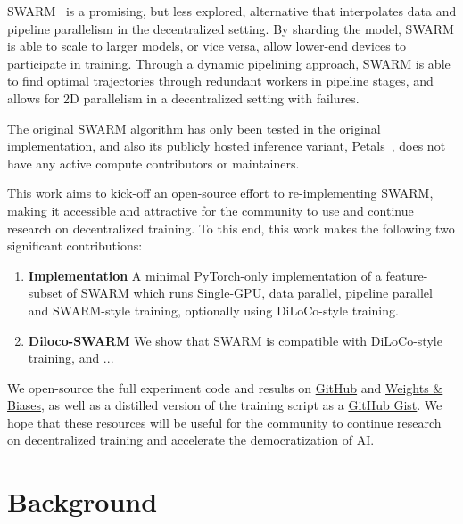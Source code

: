 \documentclass{article}
\begin{document}
SWARM~\cite{ryabinin2023} is a promising, but less explored, alternative that
interpolates data and pipeline parallelism in the decentralized setting. By sharding
the model, SWARM is able to scale to larger models, or vice versa, allow
lower-end devices to participate in training. Through a dynamic pipelining approach,
SWARM is able to find optimal trajectories through redundant workers in pipeline stages,
and allows for 2D parallelism in a decentralized setting with failures.

The original SWARM algorithm has only been tested in the original implementation,
and also its publicly hosted inference variant, Petals~\cite{borzunov2023}, does 
not have any active compute contributors or maintainers.

This work aims to kick-off an open-source effort to re-implementing SWARM, making
it accessible and attractive for the community to use and continue research on decentralized training. To this end, this work makes the following two significant contributions:

\begin{enumerate}
  \item \textbf{Implementation} A minimal PyTorch-only implementation of a feature-subset of SWARM which runs Single-GPU, data parallel, pipeline parallel and SWARM-style training, optionally using DiLoCo-style training.
  \item \textbf{Diloco-SWARM} We show that SWARM is compatible with DiLoCo-style training, and ... %
\end{enumerate}

We open-source the full experiment code and results on \href{https://github.com/mikasenghaas/swarm}{GitHub} and \href{https://wandb.ai/mikasenghaas/swarm}{Weights \& Biases}, as well as a distilled version of the training script as a \href{https://gist.github.com/mikasenghaas/5fa1aa77ea69f187f531a5889983c249}{GitHub Gist}. We hope that these resources will be useful for the community to continue research on decentralized training
and accelerate the democratization of AI.

\section{Background}

\end{document}
